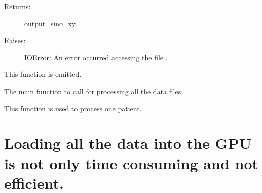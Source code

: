 \documentclass[letterpaper,10pt,english]{sphinxmanual}
\begin{document}
\begin{fulllineitems}
\begin{fulllineitems}
\begin{description}
\item[{Returns:}] \leavevmode
output\_sino\_xy

\item[{Raises:}] \leavevmode
IOError: An error occurred accessing the file .

\end{description}

\end{fulllineitems}


\begin{fulllineitems}
\label{\detokenize{usage/data:sino_process_tof.Sinogram_Processor.remove_block}}
This function is omitted.

\end{fulllineitems}


\end{fulllineitems}


\begin{fulllineitems}
\label{\detokenize{usage/data:sino_process_tof.main}}
The main function to call for processing all the data files.

\end{fulllineitems}


\begin{fulllineitems}
\label{\detokenize{usage/data:sino_process_tof.process_sinogram}}
This function is used to process one patient.

\end{fulllineitems}



\section{Loading all the data into the GPU is not only time consuming and not efficient.}
\label{\detokenize{usage/data:loading-all-the-data-into-the-gpu-is-not-only-time-consuming-and-not-efficient}}
\end{document}
